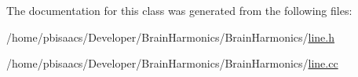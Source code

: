 The documentation for this class was generated from the following files\+:\begin{DoxyCompactItemize}
\item 
/home/pbisaacs/\+Developer/\+Brain\+Harmonics/\+Brain\+Harmonics/\mbox{\hyperlink{line_8h}{line.\+h}}\item 
/home/pbisaacs/\+Developer/\+Brain\+Harmonics/\+Brain\+Harmonics/\mbox{\hyperlink{line_8cc}{line.\+cc}}\end{DoxyCompactItemize}
